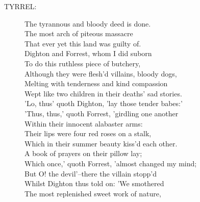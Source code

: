 \documentclass{article}
\begin{document}
\begin{description}
\item[TYRREL:] 
\hspace{1pt}The tyrannous and bloody deed is done.\\
\hspace{1pt}The most arch of piteous massacre\\
\hspace{1pt}That ever yet this land was guilty of.\\
\hspace{1pt}Dighton and Forrest, whom I did suborn\\
\hspace{1pt}To do this ruthless piece of butchery,\\
\hspace{1pt}Although they were flesh'd villains, bloody dogs,\\
\hspace{1pt}Melting with tenderness and kind compassion\\
\hspace{1pt}Wept like two children in their deaths' sad stories.\\
\hspace{1pt}'Lo, thus' quoth Dighton, 'lay those tender babes:'\\
\hspace{1pt}'Thus, thus,' quoth Forrest, 'girdling one another\\
\hspace{1pt}Within their innocent alabaster arms:\\
\hspace{1pt}Their lips were four red roses on a stalk,\\
\hspace{1pt}Which in their summer beauty kiss'd each other.\\
\hspace{1pt}A book of prayers on their pillow lay;\\
\hspace{1pt}Which once,' quoth Forrest, 'almost changed my mind;\\
\hspace{1pt}But O! the devil'--there the villain stopp'd\\
\hspace{1pt}Whilst Dighton thus told on: 'We smothered\\
\hspace{1pt}The most replenished sweet work of nature,\\

\end{description}
\end{document}
